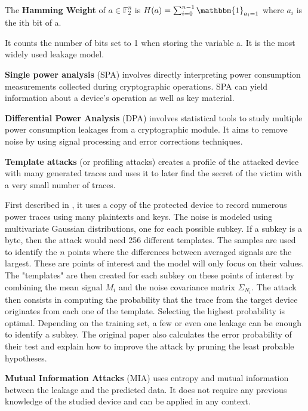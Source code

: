 \documentclass[11pt]{sdm}
\begin{document}
The \textbf{Hamming Weight} of $a \in \mathbb{F}_2^n$ is $H(a) = \sum_{i=0}^{n-1} \mathbbm{1}_{a_i = 1}$ where $a_i$ is the ith bit of a.

It counts the number of bits set to 1 when storing the variable a.
It is the most widely used leakage model.

\textbf{Single power analysis} (SPA) involves directly interpreting power consumption measurements collected during cryptographic operations. %
SPA can yield information about a device's operation as well as key material.

\textbf{Differential Power Analysis} (DPA) involves statistical tools to study multiple power consumption leakages from a cryptographic module.
It aims to remove noise by using signal processing and error corrections techniques.


\textbf{Template attacks} (or profiling attacks) creates a profile of the attacked device with many generated traces and uses it to later find the secret of the victim with a very small number of traces.

First described in \parencite{Chari_Rao_Rohatgi_2003}, it uses a copy of the protected device to record numerous power traces using many plaintexts and keys.
The noise is modeled using multivariate Gaussian distributions, one for each possible subkey.
If a subkey is a byte, then the attack would need 256 different templates.
The samples are used to identify the $n$ points where the differences between averaged signals are the largest.
These are points of interest and the model will only focus on their values.
The "templates" are then created for each subkey on these points of interest by combining the mean signal $M_i$ and the noise covariance matrix $\Sigma_{N_i}$.
The attack then consists in computing the probability that the trace from the target device originates from each one of the template.
Selecting the highest probability is optimal.
Depending on the training set, a few or even one leakage can be enough to identify a subkey.
The original paper also calculates the error probability of their test and explain how to improve the attack by pruning the least probable hypotheses.


\textbf{Mutual Information Attacks} (MIA) uses entropy and mutual information between the leakage and the predicted data.
It does not require any previous knowledge of the studied device and can be applied in any context.
\end{document}
